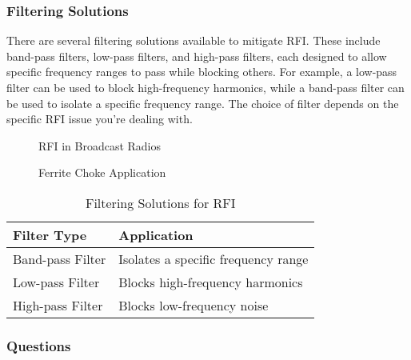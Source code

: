 \subsubsection*{Filtering Solutions}
There are several filtering solutions available to mitigate RFI. These include band-pass filters, low-pass filters, and high-pass filters, each designed to allow specific frequency ranges to pass while blocking others. For example, a low-pass filter can be used to block high-frequency harmonics, while a band-pass filter can be used to isolate a specific frequency range. The choice of filter depends on the specific RFI issue you're dealing with.

\begin{figure}[h]
    \centering
    \caption{RFI in Broadcast Radios}
    \label{fig:rfi-broadcast}
\end{figure}

\begin{figure}[h]
    \centering
    \caption{Ferrite Choke Application}
    \label{fig:ferrite-choke}
\end{figure}

\begin{table}[h]
    \centering
    \begin{tabular}{|l|l|}
        \hline
        \textbf{Filter Type} & \textbf{Application} \\
        \hline
        Band-pass Filter & Isolates a specific frequency range \\
        Low-pass Filter & Blocks high-frequency harmonics \\
        High-pass Filter & Blocks low-frequency noise \\
        \hline
    \end{tabular}
    \caption{Filtering Solutions for RFI}
    \label{tab:rfi-filters}
\end{table}

\subsubsection*{Questions}

